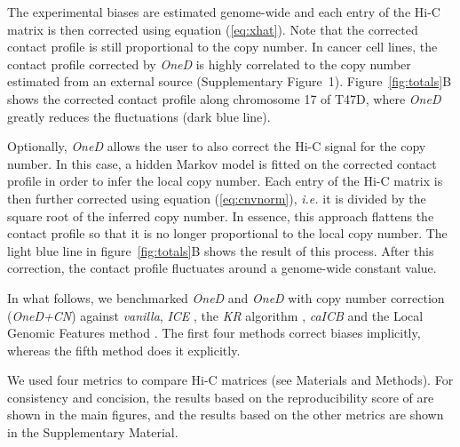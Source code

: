 \documentclass[a4,center,fleqn]{NAR}
\begin{document}
The experimental biases are estimated genome-wide and each entry of the
Hi-C matrix is then corrected using equation (\ref{eq:xhat}). Note that
the corrected contact profile is still proportional to the copy number.
In cancer cell lines, the contact profile corrected by \textit{OneD} is
highly correlated to the copy number estimated from an external source
(Supplementary Figure~1). Figure~\ref{fig:totals}B shows the corrected
contact profile along chromosome 17 of T47D, where \textit{OneD} greatly
reduces the fluctuations (dark blue line).

Optionally, \textit{OneD} allows the user to also correct the Hi-C signal
for the copy number. In this case, a hidden Markov model is fitted on the
corrected contact profile in order to infer the local copy number. Each
entry of the Hi-C matrix is then further corrected using equation
(\ref{eq:cnvnorm}), \textit{i.e.} it is divided by the square root of the
inferred copy number. In essence, this approach flattens the contact
profile so that it is no longer proportional to the local copy number. The
light blue line in figure~\ref{fig:totals}B shows the result of this
process. After this correction, the contact profile fluctuates around a
genome-wide constant value.

In what follows, we benchmarked \textit{OneD} and \textit{OneD} with copy
number correction (\textit{OneD+CN}) against \textit{vanilla},
\textit{ICE} \citep{imakaev2012iterative}, the \textit{KR} algorithm
\citep{knight2013fast}, \textit{caICB} \citep{wu2016computational} and the
Local Genomic Features method \citep[\textit{LGF},][]{hu2012hicnorm,
servant2012hitc}. The first four methods correct biases implicitly,
whereas the fifth method does it explicitly.

We used four metrics to compare Hi-C matrices (see Materials and Methods).
For consistency and concision, the results based on the reproducibility
score of \cite{yan2017hicspector} are shown in the main figures, and the
results based on the other metrics are shown in the Supplementary
Material.
\end{document}
